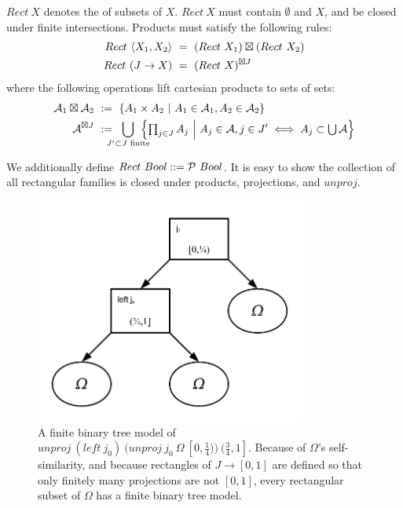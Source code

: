 \begin{definition}
\label{def:standard-rectangle}
$Rect~X$ denotes the  of subsets of $X$.
$Rect~X$ must contain $\emptyset$ and $X$, and be closed under finite intersections.
Products must satisfy the following rules:
\begin{align}
	Rect~\langle{X_1,X_2}\rangle &\ = \ (Rect~X_1) \boxtimes (Rect~X_2)
	\label{eqn:standard-rect-finite-product-rule}
\\
	Rect~(J \to X) &\ = \ (Rect~X)^{\boxtimes J}
	\label{eqn:standard-rect-arbitrary-product-rule}
\end{align}
where the following operations lift cartesian products to sets of sets:
\begin{align}
	\A_1 \boxtimes \A_2 &\ := \ \setb{A_1 \times A_2}{A_1 \in \A_1, A_2 \in \A_2}
\\
	\A^{\boxtimes J} &\ := \ \!\!\!\!\!\!\!\displaystyle\bigcup_{J' \subset J \text{ finite}}\!\!\!\!\!\! \left\{\textstyle\prod_{j \in J} A_j\ \middle|\ A_j \in \A, j \in J' \iff A_j \subset \U\A\right\}
\label{eqn:rectangular-product}
\end{align}
\end{definition}

We additionally define $Rect~Bool ::= \mathcal{P}~Bool$.
It is easy to show the collection of all rectangular families is closed under products, projections, and $unproj$.

\begin{figure}[tb!]\centering
\includegraphics[width=3.5in]{figures/random-tree-rect}
\caption[A finite model of a rectangular subset of $\Omega$]{A finite binary tree model of $unproj~(left~j_0)~(unproj~j_0~\Omega~[0,\frac{1}{4}))~(\frac{3}{4},1]$. Because of $\Omega$'s self-similarity, and because rectangles of $J \to [0,1]$ are defined so that only finitely many projections are not $[0,1]$, every rectangular subset of $\Omega$ has a finite binary tree model.}
\label{fig:omega-rect-tree}
\end{figure}

